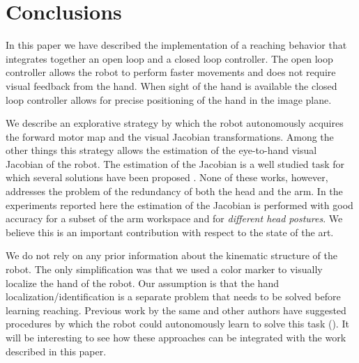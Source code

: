 \section{Conclusions}
In this paper we have described the implementation of a reaching
behavior that integrates together an open loop and a closed 
loop controller. The open loop controller
allows the robot to perform faster movements and does not require visual 
feedback from the hand. When sight of the hand is available the closed
loop controller allows for precise positioning of the hand in the 
image plane. 

We describe an explorative strategy by which the robot autonomously 
acquires the forward motor map and the visual Jacobian transformations. 
Among the other things this strategy 
allows the estimation of the eye-to-hand visual Jacobian of the robot. 
The estimation of the Jacobian is a well studied task for which several 
solutions have been proposed \cite{Hosoda94versatile,Mansard06jacobian,
Lapreste04efficient}. None of these works, however, addresses the 
problem of the redundancy of both the head and the arm. In the experiments 
reported here the estimation of the Jacobian is performed with good 
accuracy for a subset of the arm workspace and for 
\emph{different head postures}. We believe
this is an important contribution with respect to the state of the art.

We do not rely on any prior information about the 
kinematic structure of the robot. The only simplification was that we used 
a color marker to visually localize the hand of the robot. Our assumption
is that the hand localization/identification is a separate problem
that needs to be solved before learning reaching. Previous work
by the same and other authors have suggested procedures by which 
the robot could autonomously learn to solve this task 
(\cite{Natale05,edsinger06what}). It will be interesting to see
how these approaches can be integrated with the work described 
in this paper.
